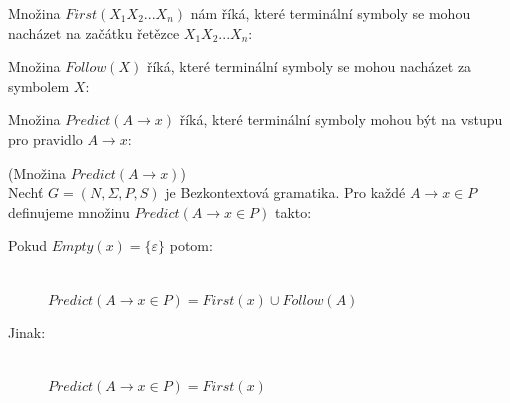 \noindent
Množina $First(X_1X_2 ... X_n)$ nám říká, které terminální symboly
se mohou nacházet na začátku řetězce $X_1X_2 ... X_n$:\\
\begin{algorithm}[H]
  \caption{$First(X_1X_2 ... X_n)$}

  \BlankLine
\end{algorithm}
\vspace{0.5cm}

\noindent
Množina $Follow(X)$ říká, které terminální symboly se mohou nacházet
za symbolem $X$:\\
\begin{algorithm}[H]
  \caption{$Follow(X)$}
  \label{alg:follow}

  \BlankLine
\end{algorithm}
\vspace{0.5cm}

\noindent
Množina $Predict(A \rightarrow x)$ říká, které terminální symboly mohou být
na vstupu pro pravidlo $A \rightarrow x$:
\begin{defn}
  (Množina $Predict(A \rightarrow x)$)\\
  Nechť $G = (N, \Sigma, P, S)$ je Bezkontextová gramatika.
  Pro každé $A \rightarrow x \in P$ definujeme množinu
  $Predict(A \rightarrow x \in P)$ takto:
  \begin{description}
    \item[Pokud $Empty(x) = \{\varepsilon\}$ potom:]\hfill \\
    $Predict(A \rightarrow x \in P) = First(x) \cup Follow(A)$
    \item[Jinak:]\hfill \\
    $Predict(A \rightarrow x \in P) = First(x)$
  \end{description}
\end{defn}
\vspace{0.5cm}

